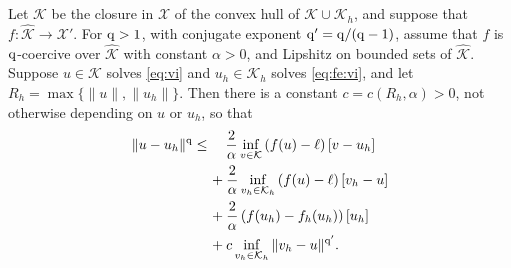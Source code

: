 \documentclass[hidelinks,onefignum,onetabnum,final]{siamart220329}  %
\newcommand{\cK}{\mathcal{K}}
\newcommand{\cX}{\mathcal{X}}
\newcommand{\hcK}{\widehat{\cK}}
\newcommand{\qq}{{\text{\textnormal{q}}}}
\begin{document}
\begin{theorem} \label{thm:abstractestimate}  Let $\hcK$ be the closure in $\cX$ of the convex hull of $\cK \cup \cK_h$, and suppose that $f:\hcK \to \cX'$.  For $\qq>1$, with conjugate exponent $\qq'=\qq/(\qq-1)$, assume that $f$ is $\qq$-coercive over $\hcK$ with constant $\alpha>0$, and Lipshitz on bounded sets of $\hcK$.  Suppose $u\in\cK$ solves \eqref{eq:vi} and $u_h\in\cK_h$ solves \eqref{eq:fe:vi}, and let $R_h=\max\{\|u\|,\|u_h\|\}$.  Then there is a constant $c=c(R_h,\alpha)>0$, not otherwise depending on $u$ or $u_h$, so that
\begin{align}
\|u-u_h\|^\qq &\le \quad \frac{2}{\alpha} \inf_{v\in\cK} \left(f(u)-\ell\right)[v-u_h] \label{eq:abstractestimate} \\
   &\quad\, + \frac{2}{\alpha} \inf_{v_h\in\cK_h} \left(f(u)-\ell\right)[v_h-u] \notag \\
   &\quad\, + \frac{2}{\alpha} \left(f(u_h)-f_h(u_h)\right)[u_h] \notag \\
   &\quad\, + c \inf_{v_h\in\cK_h} \|v_h - u\|^{\qq'}. \notag
\end{align}
\end{theorem}
\end{document}
